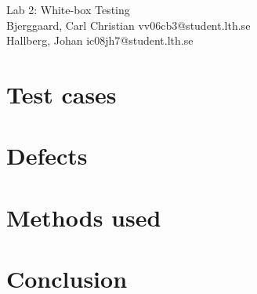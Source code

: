 \documentclass[titlepage]{article}
\begin{document}
\begin{center}
	\huge{Lab 2: White-box Testing } \\
	\small{Bjerggaard, Carl Christian vv06cb3@student.lth.se \\Hallberg, Johan ic08jh7@student.lth.se}

\vspace*{1cm}

\end{center}

\thispagestyle{empty}

\clearpage
\section{Test cases}
\label{testcases}
%


\section{Defects}
\label{defects}


\section{Methods used}
\label{methods}
%

\section{Conclusion}
\label{conclusion}
%
\end{document}
